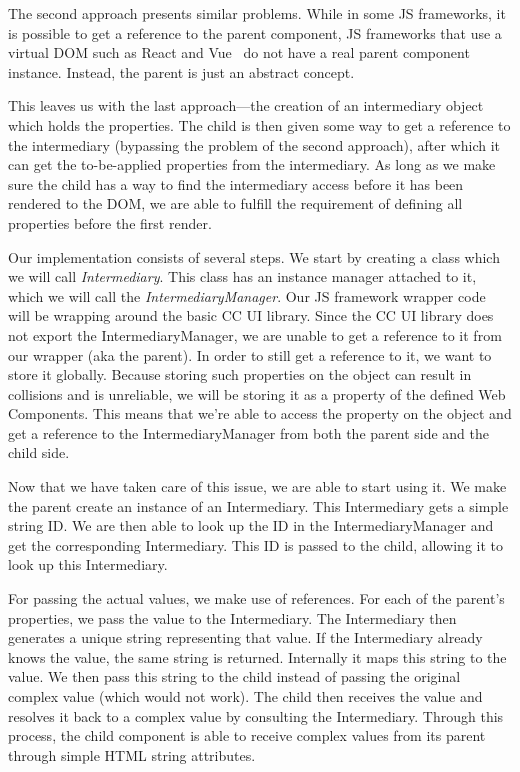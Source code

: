 {  The second approach presents similar problems. While in some JS frameworks, it is possible to get a reference to the parent component, JS frameworks that use a virtual DOM such as React and Vue~ do not have a real parent component instance. Instead, the parent is just an abstract concept.

  This leaves us with the last approach—the creation of an intermediary object which holds the properties. The child is then given some way to get a reference to the intermediary (bypassing the problem of the second approach), after which it can get the to-be-applied properties from the intermediary. As long as we make sure the child has a way to find the intermediary access before it has been rendered to the DOM, we are able to fulfill the requirement of defining all properties before the first render.
}{
  Our implementation consists of several steps. We start by creating a class which we will call \emph{Intermediary}. This class has an instance manager attached to it, which we will call the \emph{IntermediaryManager}. Our JS framework wrapper code will be wrapping around the basic CC UI library. Since the CC UI library does not export the IntermediaryManager, we are unable to get a reference to it from our wrapper (aka the parent). In order to still get a reference to it, we want to store it globally. Because storing such properties on the  object can result in collisions and is unreliable, we will be storing it as a property of the defined Web Components. This means that we're able to access the  property on the   object and get a reference to the IntermediaryManager from both the parent side and the child side.

  Now that we have taken care of this issue, we are able to start using it. We make the parent create an instance of an Intermediary. This Intermediary gets a simple string ID\@. We are then able to look up the ID in the IntermediaryManager and get the corresponding Intermediary. This ID is passed to the child, allowing it to look up this Intermediary.

  For passing the actual values, we make use of references. For each of the parent's properties, we pass the value to the Intermediary. The Intermediary then generates a unique string representing that value. If the Intermediary already knows the value, the same string is returned. Internally it maps this string to the value. We then pass this string to the child instead of passing the original complex value (which would not work). The child then receives the value and resolves it back to a complex value by consulting the Intermediary. Through this process, the child component is able to receive complex values from its parent through simple HTML string attributes.
}

